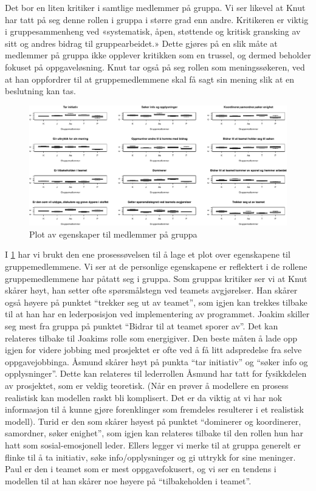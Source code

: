 Det bor en liten kritiker i samtlige medlemmer på gruppa. Vi ser likevel at Knut har tatt på 
seg denne rollen i gruppa i større grad enn andre. Kritikeren er viktig i gruppesammenheng 
ved «systematisk, åpen, støttende og kritisk gransking av sitt og andres bidrag til gruppearbeidet.»
Dette gjøres på en slik måte at medlemmer på gruppa ikke opplever kritikken som en trussel, 
og dermed beholder fokuset på oppgaveløsning. Knut tar også på seg rollen som meningssøkeren, 
ved at han oppfordrer til at gruppemedlemmene skal få sagt sin mening slik at en beslutning
kan tas.

\begin{figure}[ht!]
\centering
\includegraphics[scale=0.4]{teammedlem.pdf}
\caption{Plot av egenskaper til medlemmer på gruppa}
\label{fig:medlemmer}
\end{figure}

I \cref{fig:medlemmer} har vi brukt den ene prosessøvelsen til å
lage et plot over egenskapene til gruppemedlemmene. Vi ser at de personlige
 egenskapene er reflektert i de rollene gruppemedlemmene har påtatt seg i gruppa. Som gruppas
kritiker ser vi at Knut skårer høyt, han setter ofte spørsmålstegn ved teamets avgjørelser. 
Han skårer også høyere på punktet ``trekker seg ut av teamet'', som igjen kan trekkes tilbake 
til at han har en lederposisjon ved implementering av
programmet. Joakim skiller seg mest fra gruppa på punktet ``Bidrar til at teamet 
sporer av''. Det kan relateres tilbake til Joakims rolle som energigiver. Den beste måten å lade opp igjen
for videre jobbing med prosjektet er ofte ved å få litt adspredelse fra selve oppgavejobbinga.
Åsmund skårer høyt på punkta ``tar initiativ'' og ``søker info og opplysninger''. 
Dette kan relateres til lederrollen Åsmund har tatt for fysikkdelen av prosjektet,
som er veldig teoretisk. (Når en prøver å modellere en prosess realistisk kan
modellen raskt bli komplisert. Det er da viktig at vi har nok informasjon til å
kunne gjøre forenklinger som fremdeles resulterer i et realistisk modell).
Turid er den som skårer høyest på punktet ``dominerer og koordinerer, samordner, søker
enighet'', som igjen kan relateres tilbake til den rollen hun har hatt som
sosial-emosjonell leder. Ellers legger vi merke til at gruppa
generelt er flinke til å ta initiativ, søke info/opplysninger og gi uttrykk for sine meninger. Paul
er den i teamet som er mest oppgavefokusert, og vi ser en tendens i modellen til
at han skårer noe høyere på ``tilbakeholden i teamet''.

